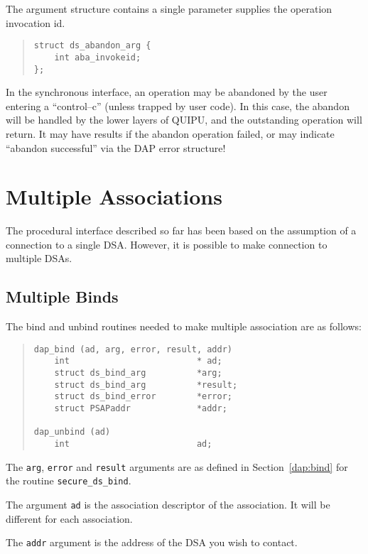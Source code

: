 The argument structure contains a single parameter 
supplies the operation invocation id.

\begin{quote}\small\begin{verbatim}
struct ds_abandon_arg {
    int aba_invokeid;
};
\end{verbatim}\end{quote}


In the synchronous interface, an operation may be abandoned by the
user entering a ``control--c'' (unless trapped by user code).
In this case, the abandon will be handled by the lower layers of
QUIPU, and the outstanding operation will return.  It may have results
if the abandon operation failed, or may indicate 
``abandon successful'' via the DAP error structure!

\section {Multiple Associations}

The procedural interface described so far has been based on the assumption 
of a connection to a single DSA.
However, it is possible to make connection to multiple DSAs.


\subsection {Multiple Binds}

The bind and unbind routines needed to make 
multiple association are as follows:
\begin{quote}\small\begin{verbatim}
dap_bind (ad, arg, error, result, addr)
    int                         * ad;
    struct ds_bind_arg          *arg;
    struct ds_bind_arg          *result;
    struct ds_bind_error        *error;
    struct PSAPaddr             *addr;

dap_unbind (ad)
    int                         ad;
\end{verbatim}\end{quote}

The \verb"arg", \verb"error" and \verb"result" arguments are as defined 
in Section~\ref{dap:bind} for the routine \verb"secure_ds_bind".

The argument \verb"ad" is the association descriptor of the association.
It will be different for each association.

The \verb"addr" argument is the address of the DSA you wish to contact.


